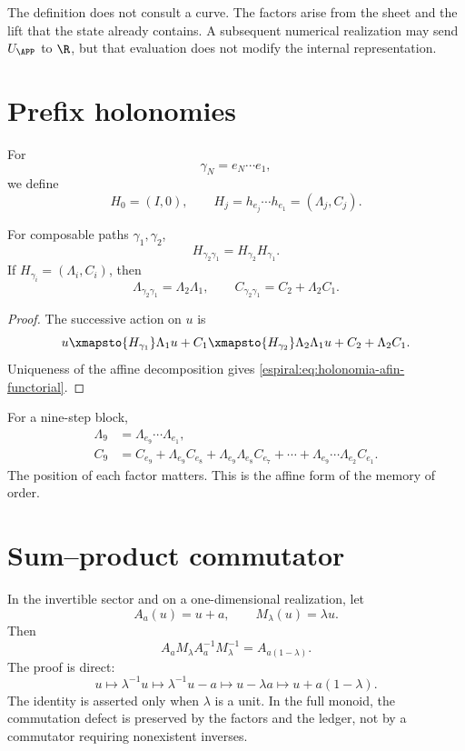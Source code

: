 The definition does not consult a curve. The factors arise from the sheet and the
lift that the state already contains. A subsequent numerical realization
may send \(U_{\APP}\) to \(\R\), but that evaluation does not modify the
internal representation.

\section{Prefix holonomies}

For
\[
 \gamma_N=e_N\cdots e_1,
\]
we define
\[
 H_0=(I,0),\qquad
 H_j=h_{e_j}\cdots h_{e_1}=(\Lambda_j,C_j).
\]

\begin{theorem}
For composable paths \(\gamma_1,\gamma_2\),
\[
 H_{\gamma_2\gamma_1}=H_{\gamma_2}H_{\gamma_1}.
\]
If \(H_{\gamma_i}=(\Lambda_i,C_i)\), then
\begin{equation}
 \Lambda_{\gamma_2\gamma_1}=\Lambda_2\Lambda_1,
 \qquad
 C_{\gamma_2\gamma_1}=C_2+\Lambda_2C_1.
 \label{espiral:eq:holonomia-afin-functorial}
\end{equation}
\end{theorem}
\begin{proof}
The successive action on \(u\) is
\[
 u\xmapsto{H_{\gamma_1}}\Lambda_1u+C_1
 \xmapsto{H_{\gamma_2}}
 \Lambda_2\Lambda_1u+C_2+\Lambda_2C_1.
\]
Uniqueness of the affine decomposition gives \cref{espiral:eq:holonomia-afin-functorial}.
\end{proof}

For a nine-step block,
\begin{align}
 \Lambda_9&=\Lambda_{e_9}\cdots\Lambda_{e_1},\\
 C_9&=C_{e_9}+\Lambda_{e_9}C_{e_8}
 +\Lambda_{e_9}\Lambda_{e_8}C_{e_7}+\cdots
 +\Lambda_{e_9}\cdots\Lambda_{e_2}C_{e_1}.
 \label{espiral:eq:traslacion-nueve}
\end{align}
The position of each factor matters. This is the affine form of the memory of
order.

\section{Sum--product commutator}

In the invertible sector and on a one-dimensional realization, let
\[
 A_a(u)=u+a,\qquad M_\lambda(u)=\lambda u.
\]
Then
\begin{equation}
 A_aM_\lambda A_a^{-1}M_\lambda^{-1}
 =A_{a(1-\lambda)}.
 \label{espiral:eq:conmutador-afin}
\end{equation}
The proof is direct:
\[
 u\mapsto\lambda^{-1}u\mapsto\lambda^{-1}u-a
 \mapsto u-\lambda a\mapsto u+a(1-\lambda).
\]
The identity is asserted only when \(\lambda\) is a unit. In the full
monoid, the commutation defect is preserved by the factors and the
ledger, not by a commutator requiring nonexistent inverses.

